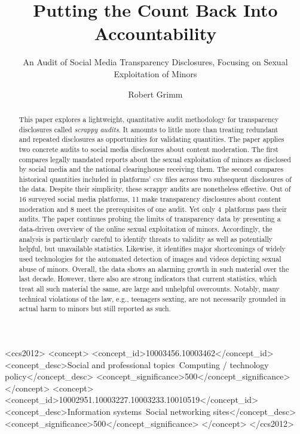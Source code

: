 \documentclass[nonacm,screen]{acmart}
\newcommand\V[1]{\textsc{\MakeLowercase{#1}}}
\begin{document}
\title{Putting the Count Back Into Accountability}
\subtitle{An Audit of Social Media Transparency Disclosures,
    Focusing on Sexual Exploitation of Minors}

\author{Robert Grimm}

\begin{abstract}
This paper explores a lightweight, quantitative audit methodology for
transparency disclosures called \emph{scrappy audits}. It amounts to little more
than treating redundant and repeated disclosures as opportunities for validating
quantities. The paper applies two concrete audits to social media disclosures
about content moderation. The first compares legally mandated reports about the
sexual exploitation of minors as disclosed by social media and the national
clearinghouse receiving them. The second compares historical quantities included
in platforms' \V{CSV} files across two subsequent disclosures of the data.
Despite their simplicity, these scrappy audits are nonetheless effective. Out of
16 surveyed social media platforms, 11 make transparency disclosures about
content moderation and 8 meet the prerequisites of one audit. Yet only
4~platforms pass their audits. The paper continues probing the limits of
transparency data by presenting a data-driven overview of the online sexual
exploitation of minors. Accordingly, the analysis is particularly careful to
identify threats to validity as well as potentially helpful, but unavailable
statistics. Likewise, it identifies major shortcomings of widely used
technologies for the automated detection of images and videos depicting sexual
abuse of minors. Overall, the data shows an alarming growth in such material
over the last decade. However, there also are strong indicators that current
statistics, which treat all such material the same, are large and unhelpful
overcounts. Notably, many technical violations of the law, e.g., teenagers
sexting, are not necessarily grounded in actual harm to minors but still
reported as such.
\end{abstract}

\begin{CCSXML}
<ccs2012>
<concept>
<concept_id>10003456.10003462</concept_id>
<concept_desc>Social and professional topics~Computing / technology policy</concept_desc>
<concept_significance>500</concept_significance>
</concept>
<concept>
<concept_id>10002951.10003227.10003233.10010519</concept_id>
<concept_desc>Information systems~Social networking sites</concept_desc>
<concept_significance>500</concept_significance>
</concept>
</ccs2012>
\end{CCSXML}
\end{document}
